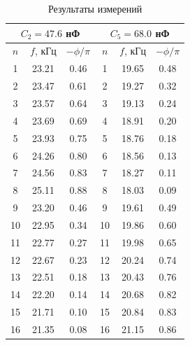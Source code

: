 \documentclass[a4paper,14pt]{article}
\begin{document}
\begin{enumerate}
\begin{table}[hbt!]
\begin{center}
	\begin{tabular}{ccc||c|c|c|}
		\hline
		\multicolumn{3}{|c||}{$C_2 = 47.6 $ нФ} & \multicolumn{3}{c|}{$C_5 = 68.0$ нФ} \\ \hline
		\multicolumn{1}{|c|}{$n$} & \multicolumn{1}{c|}{$f$, кГц} & $-\phi/ \pi$ & $n$ & $f$, кГц & $-\phi/ \pi$ \\ \hline
		\multicolumn{1}{|c|}{1} & \multicolumn{1}{c|}{23.21} & 0.46 & 1 & 19.65 & 0.48 \\ \hline
		\multicolumn{1}{|c|}{2} & \multicolumn{1}{c|}{23.47} & 0.61 & 2 & 19.27 & 0.32 \\ \hline
		\multicolumn{1}{|c|}{3} & \multicolumn{1}{c|}{23.57} & 0.64 & 3 & 19.13 & 0.24 \\ \hline
		\multicolumn{1}{|c|}{4} & \multicolumn{1}{c|}{23.69} & 0.69 & 4 & 18.91 & 0.20 \\ \hline
		\multicolumn{1}{|c|}{5} & \multicolumn{1}{c|}{23.93} & 0.75 & 5 & 18.76 & 0.18 \\ \hline
		\multicolumn{1}{|c|}{6} & \multicolumn{1}{c|}{24.26} & 0.80 & 6 & 18.56 & 0.13 \\ \hline
		\multicolumn{1}{|c|}{7} & \multicolumn{1}{c|}{24.56} & 0.83 & 7 & 18.27 & 0.11 \\ \hline
		\multicolumn{1}{|c|}{8} & \multicolumn{1}{c|}{25.11} & 0.88 & 8 & 18.03 & 0.09 \\ \hline
		\multicolumn{1}{|c|}{9} & \multicolumn{1}{c|}{23.20} & 0.46 & 9 & 19.61 & 0.49 \\ \hline
		\multicolumn{1}{|c|}{10} & \multicolumn{1}{c|}{22.95} & 0.34 & 10 & 19.86 & 0.60 \\ \hline
		\multicolumn{1}{|c|}{11} & \multicolumn{1}{c|}{22.77} & 0.27 & 11 & 19.98 & 0.65 \\ \hline
		\multicolumn{1}{|c|}{12} & \multicolumn{1}{c|}{22.67} & 0.23 & 12 & 20.24 & 0.74 \\ \hline
		\multicolumn{1}{|c|}{13} & \multicolumn{1}{c|}{22.51} & 0.18 & 13 & 20.43 & 0.76 \\ \hline
		\multicolumn{1}{|c|}{14} & \multicolumn{1}{c|}{22.20} & 0.14 & 14 & 20.68 & 0.82 \\ \hline
		\multicolumn{1}{|c|}{15} & \multicolumn{1}{c|}{21.71} & 0.10 & 15 & 20.84 & 0.83 \\ \hline
		\multicolumn{1}{|c|}{16} & \multicolumn{1}{c|}{21.35} & 0.08 & 16 & 21.15 & 0.86 \\ \hline
	\end{tabular}
\end{center}
\caption{Результаты измерений}
\end{table}


\end{enumerate}
\end{document}

